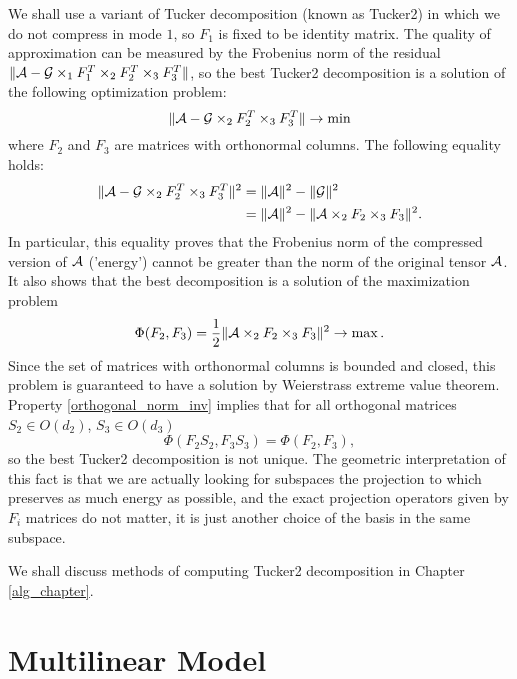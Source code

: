 We shall use a variant of Tucker decomposition (known as Tucker2)
in which we do not compress in mode $1$, so $F_1$ is fixed to be
identity matrix.  
The quality of approximation can be measured by the Frobenius norm of the residual $\| \mathcal{A} - \mathcal{G} \times _{1} F^T_1 \times _{2} F^T _2 \times _{3} F^T_3 \|$,
so the best Tucker2 decomposition is a solution of
the following optimization problem:
\begin{equation}
    \label{tucker_min}
\| \mathcal{A} - \mathcal{G} \times_2 F_2^T \times_3 F_3^T \| \to \min
\end{equation}
where $F_2$ and $F_3$ are matrices with orthonormal columns.
The following equality holds:
\begin{equation}
\label{tucker_min_max}
\begin{split}
    \| \mathcal{A} - \mathcal{G} \times_2 {F_2^T} \times_3 {F_3^T} \|^2  &= \| \mathcal{A} \|^2 - \| \mathcal{G} \|^2 \\
                                                       & = \| \mathcal{A} \|^2 - \| \mathcal{A} \times_2 {F_2} \times_3 {F_3} \|^2.
\end{split}
\end{equation}
In particular, this equality proves that the Frobenius norm
of the compressed version of $\mathcal{A}$ ('energy') cannot be greater than the norm
of the original tensor $\mathcal{A}$. It also shows that the best decomposition
is a solution of the maximization problem
\begin{equation}
\label{tucker_max}
\Phi(F_2, F_3) = \frac{1}{2} \| \mathcal{A} \times_2 F_2 \times_3 F_3 \|^2 \to \max.
\end{equation}
Since the set of matrices with orthonormal columns is bounded and closed,
this problem is guaranteed to have a solution by Weierstrass extreme value theorem.
Property \eqref{orthogonal_norm_inv} implies that
for all orthogonal matrices $S_2 \in O(d_2)$, $S_3 \in O(d_3)$
\begin{equation}
    \Phi(F_2 S_2, F_3 S_3) = \Phi(F_2, F_3),
\end{equation}
so the best Tucker2 decomposition is not unique. 
The geometric interpretation of this fact
is that we are actually looking for subspaces
the projection to which preserves as much energy
as possible, and the exact projection operators
given by $F_i$ matrices do not matter, it is 
just another choice of the basis in the same subspace.



We shall discuss methods of computing Tucker2 decomposition in Chapter \ref{alg_chapter}.


\section{Multilinear Model}


